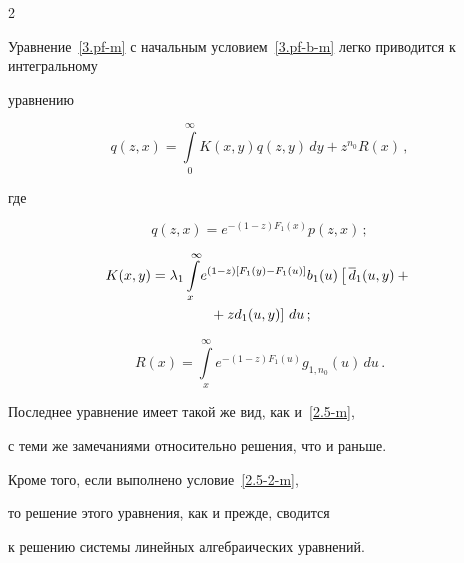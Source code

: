 \begin{multicols}{2}
\begin{equation}
\end{equation}





Уравнение~\eqref{3.pf-m} с начальным условием~\eqref{3.pf-b-m} легко приводится к интегральному


уравнению


\begin{equation*}




q(z,x) = \int\limits_0^\infty K(x,y) q(z,y)\, dy


+ z^{n_0} R(x)\,,


\end{equation*}


где


$$


q(z,x) = e^{-(1-z) F_1(x)} p(z,x)\,;


$$





\vspace*{-12pt}





\noindent


\begin{multline*}


K(x,y) = \lambda_1 \int\limits_x^\infty\! e^{(1-z) \left[F_1(y) - F_1(u)\right]}


b_1(u) \left[\,\d_1(u,y) +{}\right.\\


\left.{}+ z d_1(u,y)\right]\, du\,;


\end{multline*}




$$


R(x) = \int\limits_x^\infty e^{-(1-z) F_1(u)} g_{1,n_0}(u)\, du\,.


$$


Последнее уравнение имеет такой же вид, как и~\eqref{2.5-m},


с теми же замечаниями относительно решения, что и раньше.


Кроме того, если выполнено условие~\eqref{2.5-2-m},


то решение этого уравнения, как и прежде, сводится


к решению системы линейных алгебраических уравнений.






\end{multicols}
